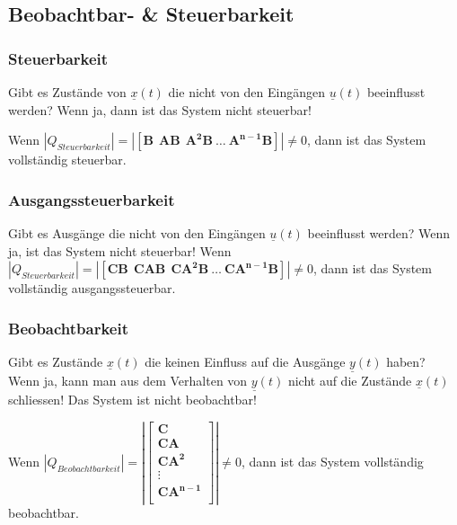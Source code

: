 \newpage
\subsection{Beobachtbar- \& Steuerbarkeit }
\subsubsection{Steuerbarkeit }
Gibt es Zustände von $\underline{x} (t)$ die nicht von den
Eingängen $\underline{u} (t)$ beeinflusst werden? Wenn ja,
dann ist das System nicht steuerbar!

Wenn $|Q_{Steuerbarkeit}|= \left| \left [ \boldsymbol{B~~AB~~ A^2B~\ldots~
A^{n-1}B} \right ] \right|  \neq 0$, dann ist das System vollständig steuerbar.

\subsubsection{Ausgangssteuerbarkeit}
Gibt es Ausgänge die nicht von den Eingängen $\underline{u} (t)$ beeinflusst werden?
Wenn ja, ist das System nicht steuerbar!
Wenn $|Q_{Steuerbarkeit}| = \left| \left [ \boldsymbol{CB~~ CAB~~ CA^2B~\ldots~
CA^{n-1}B}\right ] \right| \neq 0$, dann ist das System vollständig ausgangssteuerbar.

\subsubsection{Beobachtbarkeit }
Gibt es Zustände $\underline{x}(t)$ die keinen Einfluss auf die Ausgänge
$\underline{y}(t)$ haben? Wenn ja, kann man aus dem Verhalten von 
$\underline{y}(t)$ nicht auf die Zustände $\underline{x}(t)$ schliessen!
Das System ist nicht beobachtbar!


Wenn $|Q_{Beobachtbarkeit}| = \left| \left [ \boldsymbol{
\begin{array}{c}
 C\\
 CA\\
CA^2\\
\vdots \\
CA^{n-1}\\
\end{array}}\right ] \right| \neq 0$, dann ist das System vollständig
beobachtbar.

